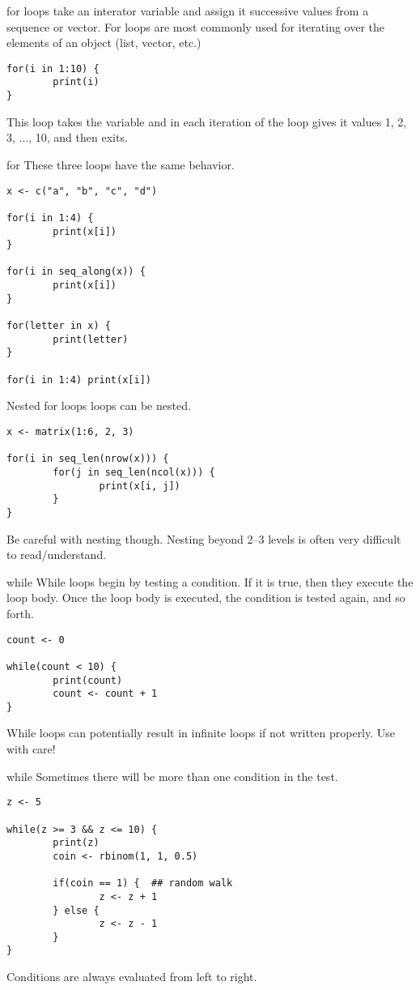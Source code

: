 \documentclass[aspectratio=169]{beamer}
\begin{document}
\begin{frame}[fragile]{for}
 loops take an interator variable and assign it successive
values from a sequence or vector.  For loops are most commonly used
for iterating over the elements of an object (list, vector, etc.)
\begin{verbatim}
for(i in 1:10) {
        print(i)
}
\end{verbatim}
This loop takes the  variable and in each iteration of the
loop gives it values 1, 2, 3, ..., 10, and then exits.
\end{frame}

\begin{frame}[fragile]{for}
These three loops have the same behavior.
\begin{verbatim}
x <- c("a", "b", "c", "d")

for(i in 1:4) {
        print(x[i])
}

for(i in seq_along(x)) {
        print(x[i])
}

for(letter in x) {
        print(letter)
}

for(i in 1:4) print(x[i])
\end{verbatim}
\end{frame}

\begin{frame}[fragile]{Nested for loops}
 loops can be nested.
\begin{verbatim}
x <- matrix(1:6, 2, 3)

for(i in seq_len(nrow(x))) {
        for(j in seq_len(ncol(x))) {
                print(x[i, j])
        }
}
\end{verbatim}
Be careful with nesting though.  Nesting beyond 2--3 levels is often
very difficult to read/understand.
\end{frame}

\begin{frame}[fragile]{while}
While loops begin by testing a condition.  If it is true, then they
execute the loop body.  Once the loop body is executed, the condition
is tested again, and so forth.
\begin{verbatim}
count <- 0

while(count < 10) {
        print(count)
        count <- count + 1
}
\end{verbatim}
While loops can potentially result in infinite loops if not written
properly.  Use with care!
\end{frame}

\begin{frame}[fragile]{while}
Sometimes there will be more than one condition in the test.
\begin{verbatim}
z <- 5

while(z >= 3 && z <= 10) {
        print(z)
        coin <- rbinom(1, 1, 0.5)

        if(coin == 1) {  ## random walk
                z <- z + 1
        } else {
                z <- z - 1
        }
}
\end{verbatim}
Conditions are always evaluated from left to right.
\end{frame}
\end{document}
